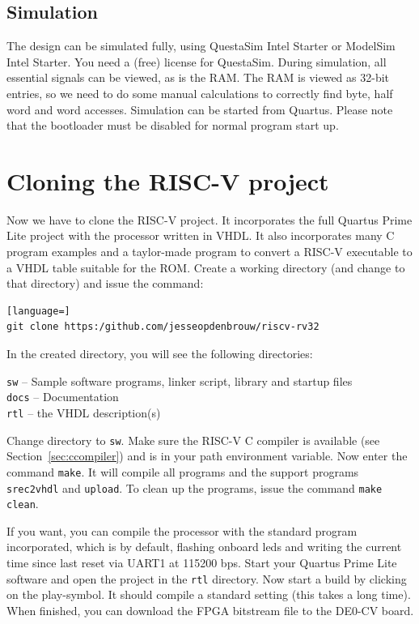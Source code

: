 \documentclass[12pt]{article}
\begin{document}
\subsection{Simulation}
The design can be simulated fully, using QuestaSim Intel Starter or ModelSim Intel Starter. You need a (free) license for QuestaSim. During simulation, all essential signals can be viewed, as is the RAM. The RAM is viewed as 32-bit entries, so we need to do some manual calculations to correctly find byte, half word and word accesses. Simulation can be started from Quartus. Please note that the bootloader must be disabled for normal program start up. 

\section{Cloning the RISC-V project}
\label{sec:cloning}
Now we have to clone the RISC-V project. It incorporates the full Quartus Prime Lite project with the processor written in VHDL. It also incorporates many C program examples and a taylor-made program to convert a RISC-V executable to a VHDL table suitable for the ROM. Create a working directory (and change to that directory) and issue the command:

\begin{lstlisting}[language=]
git clone https:/github.com/jesseopdenbrouw/riscv-rv32
\end{lstlisting}

In the created directory, you will see the following directories:

\lstinline|sw| -- Sample software programs, linker script, library and startup files \\
\lstinline|docs| -- Documentation \\
\lstinline|rtl| -- the VHDL description(s)

Change directory to \lstinline|sw|. Make sure the RISC-V C compiler is available (see Section~\ref{sec:ccompiler}) and is in your path environment variable. Now enter the command \lstinline|make|. It will compile all programs and the support programs \lstinline|srec2vhdl| and \lstinline|upload|. To clean up the programs, issue the command \lstinline|make clean|.

If you want, you can compile the processor with the standard program incorporated, which is by default, flashing onboard leds and writing the current time since last reset via UART1 at 115200 bps. Start your Quartus Prime Lite software and open the project in the \lstinline|rtl| directory. Now start a build by clicking on the play-symbol. It should compile a standard setting (this takes a long time). When finished, you can download the FPGA bitstream file to the DE0-CV board.
\end{document}
